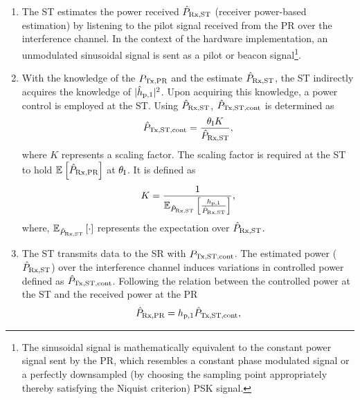 \begin{enumerate}
	\item The ST estimates the power received $\hat{P}_{\text{Rx,ST}}$ (receiver power-based estimation) by listening to the pilot signal received from the PR over the interference channel. In the context of the hardware implementation, an unmodulated sinusoidal signal is sent as a pilot or beacon signal\footnote{The sinusoidal signal is mathematically equivalent to the constant power signal sent by the PR, which resembles a constant phase modulated signal or a perfectly downsampled (by choosing the sampling point appropriately thereby satisfying the Niquist criterion) PSK signal.}.
	\item With the knowledge of the $P_{\text{Tx,PR}}$ and the estimate $\hat{P}_{\text{Rx,ST}}$, the ST indirectly acquires the knowledge of $|\hat{h}_{\text{p,1}}|^2$. 
	Upon acquiring this knowledge, a power control is employed at the ST. Using $\hat{P}_{\text{Rx,ST}}$, $\hat{P}_{\text{Tx,ST,cont}}$ is determined as 
\begin{align}
\hat{P}_{\text{Tx,ST,cont}} = \frac{\theta_{\text{I}} K}{\hat{P}_{\text{Rx,ST}}}, \label{eq:preg} 
\end{align}
where $K$ represents a scaling factor. The scaling factor is required at the ST to hold ${\mathbb E}_{}\left[ \hat{P}_{\text{Rx,PR}} \right]$ at $\theta_{\text{I}}$. It is defined as
\begin{align}
K = \frac{1}{ \e{\eprcvd}{\frac{\gpo}{\eprcvd}}},%
\end{align}
where, ${\mathbb E}_{\hat{P}_{\text{Rx,ST}}}\left[ \cdot \right]$ represents the expectation over $\hat{P}_{\text{Rx,ST}}$.
	\item The ST transmits data to the SR with $P_{\text{Tx,ST,cont}}$. 
	The estimated power ($\hat{P}_{\text{Rx,ST}}$) over the interference channel induces variations in controlled power defined as $\hat{P}_{\text{Tx,ST,cont}}$. Following the relation between the controlled power at the ST and the received power at the PR 
\begin{align}
\hat{P}_{\text{Rx,PR}}  = h_{\text{p,1}} \hat{P}_{\text{Tx,ST,cont}},
\label{eq:eprcvdpr}
\end{align}

\end{enumerate}
